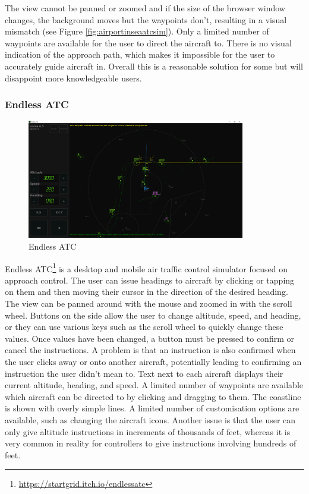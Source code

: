 \documentclass{article}
\begin{document}
The view cannot be panned or zoomed and if the size of the browser window changes, the background moves but the waypoints don't, resulting in a visual mismatch (see Figure \ref{fig:airportinseaatcsim}).
Only a limited number of waypoints are available for the user to direct the aircraft to.
There is no visual indication of the approach path, which makes it impossible for the user to accurately guide aircraft in.
Overall this is a reasonable solution for some but will disappoint more knowledgeable users.

\subsubsection{Endless ATC}
\begin{figure}[H]
\centering
\includegraphics[width=0.85\textwidth]{existing_solutions/endlessatc.png}
\caption{\label{fig:endlessatc1}Endless ATC}
\end{figure}
Endless ATC\footnote{\url{https://startgrid.itch.io/endlessatc}} is a desktop and mobile air traffic control simulator focused on approach control.
The user can issue headings to aircraft by clicking or tapping on them and then moving their cursor in the direction of the desired heading.
The view can be panned around with the mouse and zoomed in with the scroll wheel.
Buttons on the side allow the user to change altitude, speed, and heading, or they can use various keys such as the scroll wheel to quickly change these values.
Once values have been changed, a button must be pressed to confirm or cancel the instructions.
A problem is that an instruction is also confirmed when the user clicks away or onto another aircraft, potentially leading to confirming an instruction the user didn't mean to.
Text next to each aircraft displays their current altitude, heading, and speed.
A limited number of waypoints are available which aircraft can be directed to by clicking and dragging to them.
The coastline is shown with overly simple lines.
A limited number of customisation options are available, such as changing the aircraft icons.
Another issue is that the user can only give altitude instructions in increments of thousands of feet, whereas it is very common in reality for controllers to give instructions involving hundreds of feet.
\end{document}
